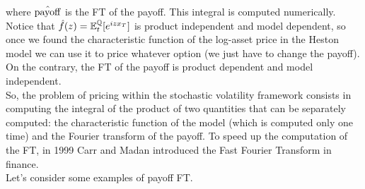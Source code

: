where $\hat{\operatorname{payoff}}$ is the FT of the payoff. This integral is computed numerically. Notice that $\hat{f}(z) = \mathbb{E}^{\mathbb{Q}}_t[e^{izx_T}]$ is product independent and model dependent, so once we found the characteristic function of the log-asset price in the Heston model we can use it to price whatever option (we just have to change the payoff). On the contrary, the FT of the payoff is product dependent and model independent.\\
So, the problem of pricing within the stochastic volatility framework consists in computing the integral of the product of two quantities that can be separately computed: the characteristic function of the model (which is computed only one time) and the Fourier transform of the payoff. To speed up the computation of the FT, in 1999 Carr and Madan introduced the Fast Fourier Transform in finance. \\ %
Let's consider some examples of payoff FT.

